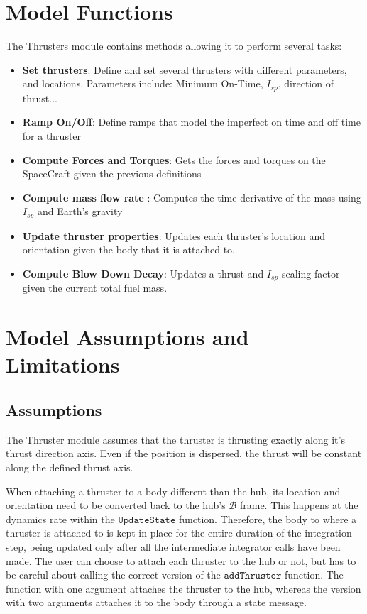 \section{Model Functions}

The Thrusters module contains methods allowing it to perform several tasks:

\begin{itemize}
	\item \textbf{Set thrusters}: Define and set several thrusters with different parameters, and locations. Parameters include: Minimum On-Time, $I_{sp}$, direction of thrust...
	\item \textbf{Ramp On/Off}: Define ramps that model the imperfect on time and off time for a thruster
	\item \textbf{Compute Forces and Torques}: Gets the forces and torques on the SpaceCraft given the previous definitions
	\item \textbf{Compute mass flow rate }: Computes the time derivative of the mass using $I_{sp}$ and Earth's gravity
	\item \textbf{Update thruster properties}: Updates each thruster's location and orientation given the body that it is attached to.
	\item \textbf{Compute Blow Down Decay}: Updates a thrust and $I_{sp}$ scaling factor given the current total fuel mass.
\end{itemize}




\section{Model Assumptions and Limitations}

\subsection{Assumptions}

The Thruster module assumes that the thruster is thrusting exactly along it's thrust direction axis. Even if the position is dispersed, the thrust will be constant along the defined thrust axis.

When attaching a thruster to a body different than the hub, its location and orientation need to be converted back to the hub's $\mathcal{B}$ frame. This happens at the dynamics rate within the $\texttt{UpdateState}$ function. Therefore, the body to where a thruster is attached to is kept in place for the entire duration of the integration step, being updated only after all the intermediate integrator calls have been made. The user can choose to attach each thruster to the hub or not, but has to be careful about calling the correct version of the $\texttt{addThruster}$ function. The function with one argument attaches the thruster to the hub, whereas the version with two arguments attaches it to the body through a state message.

